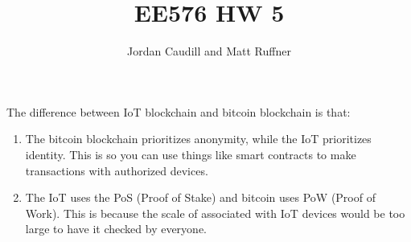 \documentclass[letterpaper]{article}
\title{EE576 HW 5}
\author{Jordan Caudill and Matt Ruffner}
\begin{document}
\maketitle

\section{}
The difference between IoT blockchain and bitcoin blockchain is that:
\begin{enumerate}
    \item 
    The bitcoin blockchain prioritizes anonymity, while the IoT prioritizes identity. This is so you can use things like smart contracts to make transactions with authorized devices.
    \item 
    The IoT uses the PoS (Proof of Stake) and bitcoin uses PoW (Proof of Work). This is because the scale of associated with IoT devices would be too large to have it checked by everyone.
\end{enumerate}

\section{}
\end{document}
